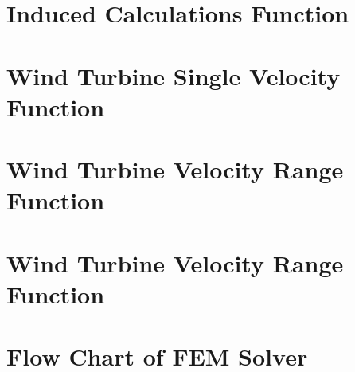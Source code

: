 \documentclass[11pt]{article}
\begin{document}
\begin{appendices}

\section{Induced Calculations Function}\label{ap:induced}



\section{Wind Turbine Single Velocity Function}\label{ap:single}


\section{Wind Turbine Velocity Range Function}\label{ap:range}


\section{Wind Turbine Velocity Range Function}\label{ap:optimisation}


\section{Flow Chart of FEM Solver}
%
%
%
%
%
%










\end{appendices}
\end{document}
